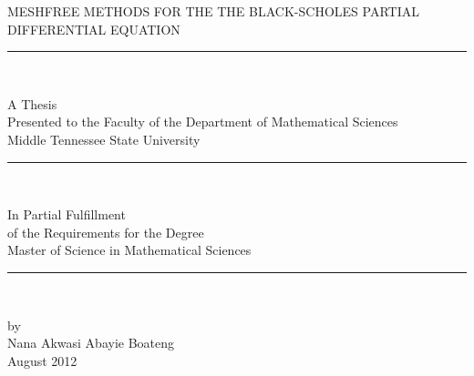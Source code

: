 \documentclass[12pt]{article}
\numberwithin{equation}{subsection} %
\begin{document}
\begin{center}
\thispagestyle{empty} %
  {MESHFREE METHODS FOR THE THE BLACK-SCHOLES  PARTIAL DIFFERENTIAL EQUATION \\ [.07in]} \rm
\rule{1.25in}{.01in}\\[.0 in]

\vspace{.6in}

A Thesis \\ [.06  in]
Presented to the Faculty of the  Department of Mathematical Sciences \\[.06in]
Middle Tennessee State University \\ [.06in]
\rule{1.25in}{.01in}\\

\vspace{.6in}

In Partial Fulfillment \\[.06 in]
of the Requirements for the Degree \\ [.06 in]
Master of Science in Mathematical Sciences \\ [.06 in]
\rule{1.25in}{.01in}\\

\vspace{.6in}

by  \\ [.06in]
{Nana  Akwasi Abayie Boateng} \\[.06in]
{August 2012}
\end{center}
\end{document}
